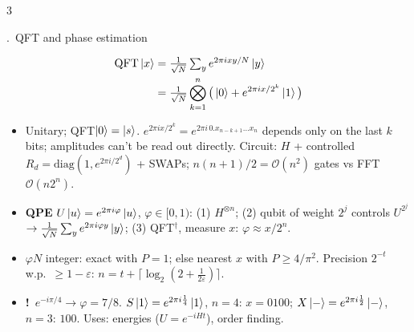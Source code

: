 \documentclass[8pt,a4paper]{extarticle}
\newcounter{sec}\newcounter{ssec}[sec]
\newcommand{\sect}[1]{\stepcounter{sec}\par\vspace{2pt}\noindent\colorbox{hd}{\parbox{\dimexpr\linewidth-2\fboxsep}{\color{white}\bfseries\strut\arabic{sec}.\ #1}}\par\vspace{0.5pt}}
\newcommand{\warn}[1]{{\color{pit}\textbf{!}~#1}}
\begin{document}
\begin{multicols}{3}
\sect{QFT and phase estimation}
\[\begin{aligned}\text{QFT}\ket x&=\tfrac1{\sqrt N}\textstyle\sum_ye^{2\pi ixy/N}\ket y\\&=\tfrac1{\sqrt N}\bigotimes_{k=1}^{n}\big(\ket0+e^{2\pi ix/2^k}\ket1\big)\end{aligned}\]
\begin{itemize}
\item Unitary; QFT$\ket0=\ket s$. $e^{2\pi ix/2^k}=e^{2\pi i\,0.x_{n-k+1}\dots x_n}$ depends only on the last $k$ bits; amplitudes can't be read out directly. Circuit: $H$ + controlled $R_d=\mathrm{diag}(1,e^{2\pi i/2^d})$ + SWAPs; $n(n+1)/2=\mathcal O(n^2)$ gates vs FFT $\mathcal O(n2^n)$.
\item \textbf{QPE} $U\ket u=e^{2\pi i\varphi}\ket u$, $\varphi\in[0,1)$: (1) $H^{\otimes n}$; (2) qubit of weight $2^j$ controls $U^{2^j}$ $\to\frac1{\sqrt N}\sum_ye^{2\pi i\varphi y}\ket y$; (3) QFT$^\dagger$, measure $x$: $\varphi\approx x/2^n$.
\item $\varphi N$ integer: exact with $P=1$; else nearest $x$ with $P\ge4/\pi^2$. Precision $2^{-t}$ w.p.\ $\ge1-\varepsilon$: $n=t+\lceil\log_2(2+\frac1{2\varepsilon})\rceil$.
\item \warn{$e^{-i\pi/4}\to\varphi=7/8$.} $S\ket1=e^{2\pi i\frac14}\ket1$, $n=4$: $x=0100$; $X\ket-=e^{2\pi i\frac12}\ket-$, $n=3$: $100$. Uses: energies ($U=e^{-iHt}$), order finding.
\end{itemize}


\end{multicols}
\end{document}
